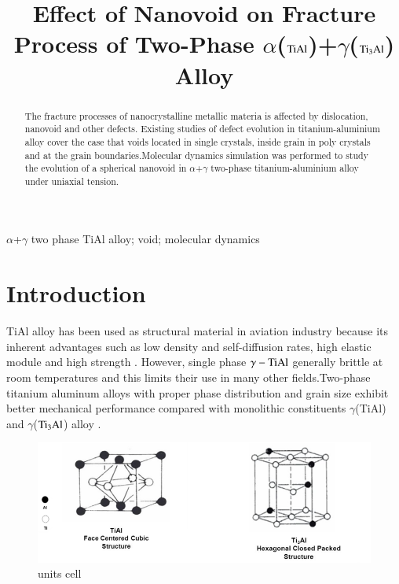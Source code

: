 \documentclass[review]{elsarticle}
\begin{document}
\begin{frontmatter}
\title{Effect of Nanovoid on Fracture Process of Two-Phase $\alpha$($\rm TiAl$)+$\gamma$($\rm Ti_3Al$) Alloy}

\address[mymainaddress]{School of Mechanical and Electronical Engineering, Lanzhou University of Technology. Lanzhou 730050, China}
\begin{abstract}
 The fracture processes of nanocrystalline metallic materia is affected by dislocation, nanovoid and other defects. Existing studies of defect evolution in titanium-aluminium alloy cover the case that voids located in single crystals, inside grain in poly crystals and at the grain boundaries.Molecular dynamics simulation was performed to study the evolution of a spherical nanovoid in $\alpha$+$\gamma$ two-phase titanium-aluminium alloy under uniaxial tension.
\end{abstract}
\begin{keyword}
$\alpha$+$\gamma$ two phase TiAl alloy; void; molecular dynamics
\end{keyword}
\end{frontmatter}
\linenumbers

\section{Introduction}
TiAl alloy has been used as structural material in aviation industry because its inherent advantages such as low density and self-diffusion rates, high elastic module and high strength \cite{Xiong2015}. However, single phase $\gamma-\rm TiAl$ generally brittle at room temperatures and this limits their use in many other fields.Two-phase titanium aluminum alloys with proper phase distribution and grain size exhibit better mechanical performance compared with monolithic constituents $\gamma$(TiAl) and $\gamma$($\rm Ti_3Al$) alloy \cite{intro-structure}.
\begin{figure}
	\centering
	\includegraphics[width=1\linewidth]{img/cell}
	\caption{units cell}
\end{figure}
\end{document}
